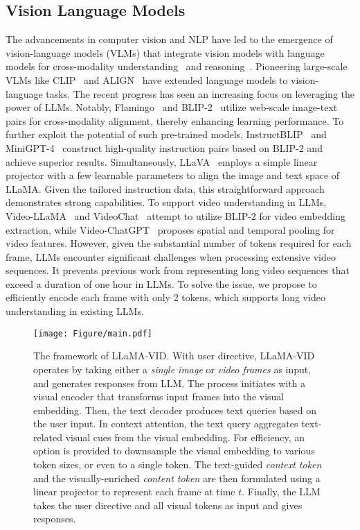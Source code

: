 \subsection{Vision Language Models}
The advancements in computer vision and NLP have led to the emergence of vision-language models (VLMs) that integrate vision models with language models for cross-modality understanding~\cite{cococap,msrvtt} and reasoning~\cite{vqav2,scienceqa,lai2023lisa}.
Pioneering large-scale VLMs like CLIP~\cite{CLIP} and ALIGN~\cite{ALIGN} have extended language models to vision-language tasks. 
The recent progress has seen an increasing focus on leveraging the power of LLMs.
Notably, Flamingo~\cite{flamingo} and BLIP-2~\cite{blip2} utilize web-scale image-text pairs for cross-modality alignment, thereby enhancing learning performance.
To further exploit the potential of such pre-trained models, InstructBLIP~\cite{instructblip} and MiniGPT-4~\cite{minigpt4} construct high-quality instruction pairs based on BLIP-2 and achieve superior results. 
Simultaneously, LLaVA~\cite{llava} employs a simple linear projector with a few learnable parameters to align the image and text space of LLaMA.
Given the tailored instruction data, this straightforward approach demonstrates strong capabilities.
To support video understanding in LLMs, Video-LLaMA~\cite{videollama} and VideoChat~\cite{videochat} attempt to utilize BLIP-2 for video embedding extraction, while Video-ChatGPT~\cite{videochatgpt} proposes spatial and temporal pooling for video features.
However, given the substantial number of tokens required for each frame, LLMs encounter significant challenges when processing extensive video sequences. 
It prevents previous work from representing long video sequences that exceed a duration of one hour in LLMs.
To solve the issue, we propose to efficiently encode each frame with only 2 tokens, which supports long video understanding in existing LLMs.

\begin{figure*}[t!]
\centering
\texttt{[image: Figure/main.pdf]} 
\caption{
The framework of LLaMA-VID.
With user directive, LLaMA-VID operates by taking either a {\em single image} or {\em video frames} as input, and generates responses from LLM.
The process initiates with a visual encoder that transforms input frames into the visual embedding.
Then, the text decoder produces text queries based on the user input.
In context attention, the text query aggregates text-related visual cues from the visual embedding.
For efficiency, an option is provided to downsample the visual embedding to various token sizes, or even to a single token.
The text-guided {\em context token} and the visually-enriched {\em content token} are then formulated using a linear projector to represent each frame at time $t$.
Finally, the LLM takes the user directive and all visual tokens as input and gives responses.
}
\label{fig:main}
\end{figure*}

